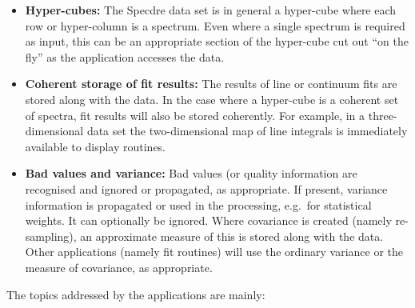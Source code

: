 \begin{itemize}
\item {\bf Hyper-cubes:} The Specdre data set is in general a hyper-cube
   where each row or hyper-column is a spectrum. Even where a single
   spectrum is required as input, this can be an appropriate section of
   the hyper-cube cut out ``on the fly'' as the application accesses the
   data.
\item {\bf Coherent storage of fit results:} The results of line or
   continuum fits are stored along with the data. In the case where a
   hyper-cube is a coherent set of spectra, fit results will also be
   stored coherently. For example, in a three-dimensional data set the
   two-dimensional map of line integrals is immediately available to
   display routines.
\item {\bf Bad values and variance:} Bad values (or quality information
   are recognised and ignored or propagated, as appropriate. If present,
   variance information is propagated or used in the processing,
   e.g.\ for statistical weights. It can optionally be ignored. Where
   covariance is created (namely re-sampling), an approximate measure of
   this is stored along with the data. Other applications (namely fit
   routines) will use the ordinary variance or the measure of
   covariance, as appropriate.
\end{itemize}

   The topics addressed by the applications are mainly:

